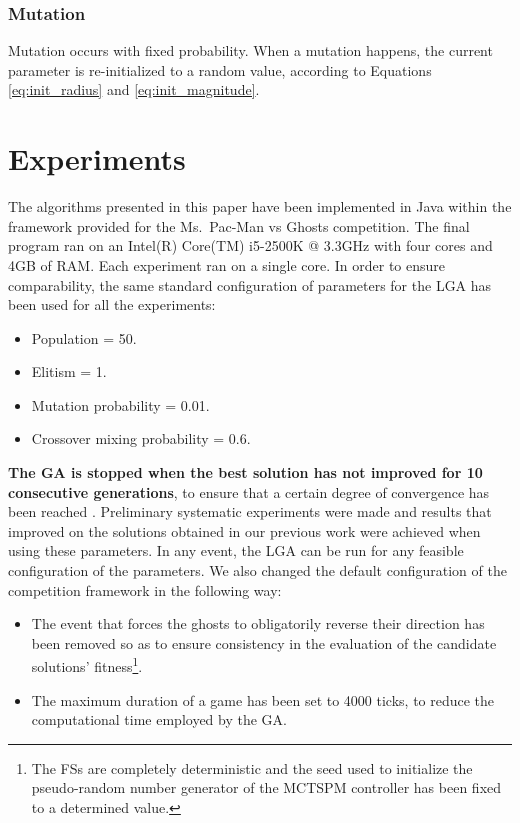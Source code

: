 \documentclass[journal]{IEEEtran}
\begin{document}
\subsubsection{Mutation}
Mutation occurs with fixed probability. When a mutation happens, the current parameter is re-initialized to a random value, according to Equations \eqref{eq:init_radius} and \eqref{eq:init_magnitude}.

\section{Experiments}
\label{sec:Experiments}
The algorithms presented in this paper have been implemented in Java within the framework provided for the Ms.\  Pac-Man vs Ghosts competition. The final program ran on an Intel(R) Core(TM) i5-2500K @ 3.3GHz with four cores and 4GB of RAM. Each experiment ran on a single core. In order to ensure comparability, the same standard configuration of parameters for the LGA has been used for all the experiments:

\begin{itemize}
  \item Population = 50.
  \item Elitism = 1.
  \item Mutation probability = 0.01.
  \item Crossover mixing probability = 0.6.
\end{itemize}

\textbf{The GA is stopped when the best solution has not improved for 10 consecutive generations}, to ensure that a certain degree of convergence has been reached \cite{Karma2003, Safe2004}. Preliminary systematic experiments were made and results that improved on the solutions obtained in our previous work \cite{Liberatore2014} were achieved when using these parameters. In any event, the LGA can be run for any feasible configuration of the parameters.  We also changed the default configuration of the competition framework in the following way:

\begin{itemize}
  \item The event that forces the ghosts to obligatorily reverse their direction has been removed so as to ensure consistency in the evaluation of the candidate solutions' fitness\footnote{The FSs are completely deterministic and the seed used to initialize the pseudo-random number generator of the MCTSPM controller has been fixed to a determined value.}.
  \item The maximum duration of a game has been set to 4000 ticks, to reduce the computational time employed by the GA.
\end{itemize}
\end{document}
